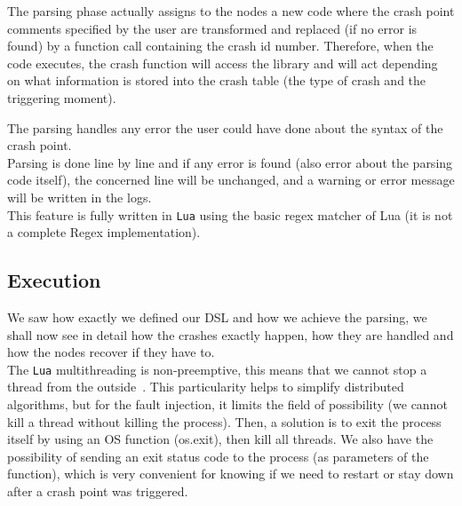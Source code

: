 \documentclass{eplmastersthesis}
\begin{document}
        The parsing phase actually assigns to the nodes a new code where the
        crash point comments specified by the user are transformed and
        replaced (if no error is found) by a function call containing the
        crash id number. Therefore, when the code executes, the crash
        function will access the library and will act depending on what
        information is stored into the crash table (the type of crash and
        the triggering moment).

        The parsing handles any error the user could have done about the
        syntax of the crash point.\\
        Parsing is done line by line and if any error is found (also error
        about the parsing code itself), the concerned line will be unchanged, and
        a warning or error message will be written in the logs.\\
        This feature is fully written in \texttt{Lua} using the basic regex matcher of Lua
        \cite{RegexLua} (it is not a complete Regex implementation).

      \subsection{Execution}

        We saw how exactly we defined our DSL and how we achieve the parsing,
        we shall now see in detail how the crashes exactly happen, how they
        are handled and how the nodes recover if they have to.\\

        The \texttt{Lua} multithreading is non-preemptive, this means that we cannot stop a thread from the
        outside~\cite{CoroutineLua}. This particularity helps to simplify distributed algorithms,
        but for the fault injection, it limits the field of possibility
        (we cannot kill a thread without killing the process).
        Then, a solution is to exit the process itself by using an OS function (os.exit),
        then kill all threads. We also have the possibility of sending an exit
        status code to the process (as parameters of the function),
        which is very convenient for knowing if we need to restart or stay
        down after a crash point was triggered.\\
\end{document}
